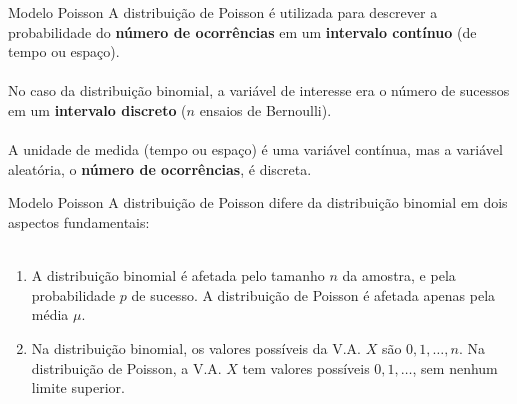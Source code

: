 \documentclass[10pt]{beamer}\usepackage[]{graphicx}\usepackage[]{color}
\theoremstyle{definition}
\begin{document}
\begin{frame}[fragile]{Modelo Poisson}
  A distribuição de Poisson é utilizada para descrever
  a probabilidade do \textbf{número de ocorrências} em um \textbf{intervalo
  contínuo} (de tempo ou espaço). \\~\\
  No caso da distribuição binomial, a variável de interesse era o número
  de sucessos em um \textbf{intervalo discreto} ($n$ ensaios de
  Bernoulli). \\~\\
  A unidade de medida (tempo ou espaço) é uma variável contínua, mas a
  \textsf{variável aleatória}, o \textbf{número de ocorrências}, é
  discreta.
\end{frame}


\begin{frame}[fragile]{Modelo Poisson}
  A distribuição de Poisson difere da distribuição binomial
  em dois aspectos fundamentais: \\~\\
  \begin{enumerate}
  \item A distribuição binomial é afetada pelo tamanho $n$ da amostra, e
    pela probabilidade $p$ de sucesso. A distribuição de Poisson é
    afetada apenas pela média $\mu$.
  \item Na distribuição binomial, os valores possíveis da V.A. $X$ são
    $0, 1, \ldots, n$. Na distribuição de Poisson, a V.A. $X$ tem
    valores possíveis $0, 1, \ldots$, sem nenhum limite superior.
  \end{enumerate}
\end{frame}
\end{document}
